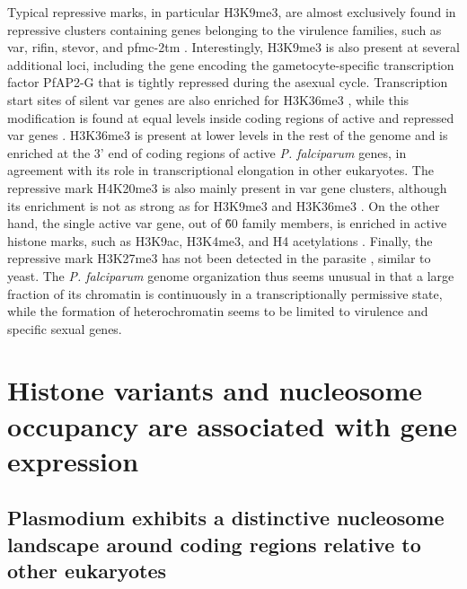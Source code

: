 Typical repressive marks, in particular H3K9me3, are almost exclusively found
in repressive clusters containing genes belonging to the virulence families,
such as var, rifin, stevor, and pfmc-2tm \citep{lopez-rubio:genome-wide,
jiang:pfsetvs, chookajorn:epigenetic, lopez-rubio:5}. Interestingly, H3K9me3
is also present at several additional loci, including the gene encoding the
gametocyte-specific transcription factor PfAP2-G
\citep{lopez-rubio:genome-wide} that is tightly
repressed during the asexual cycle. Transcription start sites of silent var
genes are also enriched for H3K36me3 \citep{jiang:pfsetvs},
while this modification is found at
equal levels inside coding regions of active and repressed var genes
\citep{jiang:pfsetvs, ukaegbu:recruitment}.
H3K36me3 is present at lower levels in the rest of the genome and is enriched
at the 3’ end of coding regions of active \textit{P. falciparum} genes, in
agreement with its role in transcriptional elongation in other eukaryotes. The
repressive mark H4K20me3 is also mainly present in var gene clusters, although
its enrichment is not as strong as for H3K9me3 and H3K36me3
\citep{jiang:pfsetvs}. On the other
hand, the single active var gene, out of \~60 family members, is enriched in
active histone marks, such as H3K9ac, H3K4me3, and H4 acetylations
\citep{jiang:pfsetvs, lopez-rubio:5}.
Finally, the repressive mark H3K27me3 has not been detected in the parasite
\citep{trelle:global}, similar to yeast. 
The \textit{P. falciparum} genome organization thus seems
unusual in that a large fraction of its chromatin is continuously in a
transcriptionally permissive state, while the formation of heterochromatin
seems to be limited to virulence and specific sexual genes.

\section{Histone variants and nucleosome occupancy are associated with gene
expression}

\subsection{Plasmodium exhibits a distinctive nucleosome landscape around
coding regions relative to other eukaryotes}

